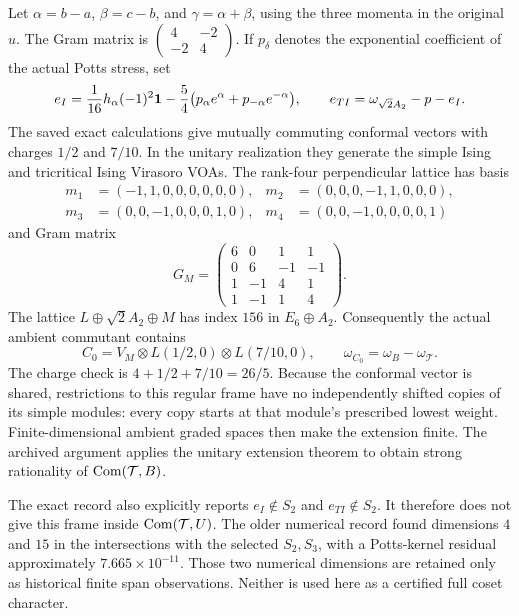 Let $\alpha=b-a$, $\beta=c-b$, and $\gamma=\alpha+\beta$, using
the three momenta in the original $u$. The Gram matrix is
$\left(\begin{smallmatrix}4&-2\\-2&4\end{smallmatrix}\right)$.
If $p_\delta$ denotes the exponential coefficient of the actual
Potts stress, set
\[
 e_I=\frac1{16}h_\alpha(-1)^2\mathbf1
       -\frac54\bigl(p_\alpha e^\alpha+p_{-\alpha}e^{-\alpha}\bigr),
 \qquad
 e_{TI}=\omega_{\sqrt2A_2}-p-e_I.
\]
The saved exact calculations give mutually commuting conformal
vectors with charges $1/2$ and $7/10$. In the unitary realization
they generate the simple Ising and tricritical Ising Virasoro VOAs.
The rank-four perpendicular lattice has basis
\[
\begin{aligned}
m_1&=(-1,1,0,0,0,0,0,0),&m_2&=(0,0,0,-1,1,0,0,0),\\
m_3&=(0,0,-1,0,0,0,1,0),&m_4&=(0,0,-1,0,0,0,0,1)
\end{aligned}
\]
and Gram matrix
\[
G_M=\begin{pmatrix}
6&0&1&1\\0&6&-1&-1\\1&-1&4&1\\1&-1&1&4
\end{pmatrix}.
\]
The lattice $L\oplus\sqrt2A_2\oplus M$ has index $156$ in
$E_6\oplus A_2$. Consequently the actual ambient commutant contains
\[
 C_0=V_M\otimes L(1/2,0)\otimes L(7/10,0),
 \qquad \omega_{C_0}=\omega_B-\omega_{\mathcal T}.
\]
The charge check is $4+1/2+7/10=26/5$. Because the conformal vector
is shared, restrictions to this regular frame have no independently
shifted copies of its simple modules: every copy starts at that
module's prescribed lowest weight. Finite-dimensional ambient graded
spaces then make the extension finite. The archived argument applies
the unitary extension theorem to obtain strong rationality of
$\operatorname{Com}(\mathcal T,B)$.

The exact record
 also explicitly
reports $e_I\notin S_2$ and $e_{TI}\notin S_2$. It therefore does
not give this frame inside $\operatorname{Com}(\mathcal T,U)$. The older numerical
record  found dimensions
$4$ and $15$ in the intersections with the selected $S_2,S_3$, with
a Potts-kernel residual approximately $7.665\times10^{-11}$.
Those two numerical dimensions are retained only as historical finite
span observations. Neither is used here as a certified full coset
character.


